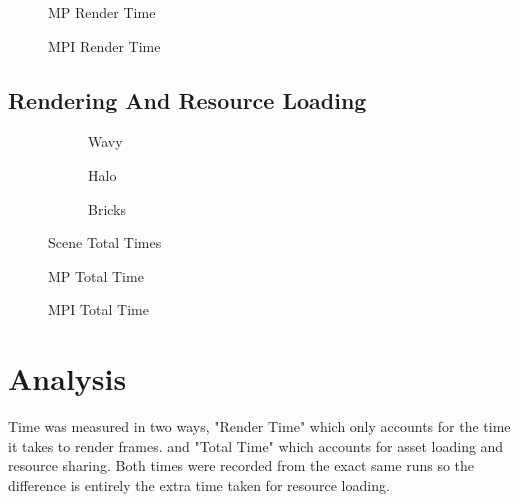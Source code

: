 \documentclass[12pt]{article}
\begin{document}
\begin{figure}[H]
	\centering
	
	\caption{MP Render Time}
	\label{table:mp_render}
\end{figure}


\begin{figure}[H]
	\centering
	
	\caption{MPI Render Time}
	\label{table:mpi_render}
\end{figure}



\subsection{Rendering And Resource Loading}

\begin{figure}[H]
	\centering
	\begin{subfigure}{.475\linewidth}
		\centering
		
		\caption{Wavy}
		\label{plot:wavy_all}
	\end{subfigure}\hfill
	\begin{subfigure}{.475\linewidth}
		\centering
		
		\caption{Halo}
		\label{plot:halo_all}
	\end{subfigure}
	\medskip
	\begin{subfigure}{.475\linewidth}
		\centering
		
		\caption{Bricks}
		\label{plot:bricks_all}
	\end{subfigure}
	\caption{Scene Total Times}
	\label{plot:all}
\end{figure}


\begin{figure}[H]
	\centering
	
	\caption{MP Total Time}
	\label{table:mp_all}
\end{figure}


\begin{figure}[H]
	\centering
	
	\caption{MPI Total Time}
	\label{table:mpi_all}
\end{figure}

\section{Analysis}

Time was measured in two ways, "Render Time" which only accounts for the time it takes to render frames. and "Total Time" which accounts for asset loading and resource sharing. Both times were recorded from the exact same runs so the difference is entirely the extra time taken for resource loading.\\
\end{document}
